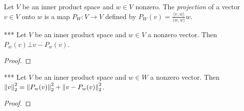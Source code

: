     \begin{definition}
        Let $V$ be an inner product space and $w\in V$ nonzero. The \textit{projection} of a vector $v\in V$ onto $w$ is a map $P_W:V \rightarrow V$ defined by $P_W(v) = \frac{\langle v,w \rangle}{\langle w,w \rangle}w$.
        \begin{center}
        \end{center}
    \end{definition}

    \begin{proposition}***
        Let $V$ be an inner product space and $w \in V$ a nonzero vector. Then $P_w(v) \bot v - P_w(v)$.
    \end{proposition}
        \begin{proof}
            
        \end{proof}

    \begin{corollary}***
        Let $V$ be an inner product space and $w \in W$ a nonzero vector. Then $\left\lVert v \right\rVert_2^2 = \left\lVert P_w(v) \right\rVert_2^2 + \left\lVert v - P_w(v) \right\rVert_2^2$.
    \end{corollary}
        \begin{proof}
            
        \end{proof}


